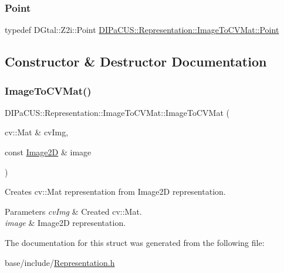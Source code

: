 \mbox{\label{structDIPaCUS_1_1Representation_1_1ImageToCVMat_a9add92562bf46f1f3bb8e944bf00e775}} 
\subsubsection{\texorpdfstring{Point}{Point}}
{\footnotesize\ttfamily typedef D\+Gtal\+::\+Z2i\+::\+Point \mbox{\hyperlink{structDIPaCUS_1_1Representation_1_1ImageToCVMat_a9add92562bf46f1f3bb8e944bf00e775}{D\+I\+Pa\+C\+U\+S\+::\+Representation\+::\+Image\+To\+C\+V\+Mat\+::\+Point}}}



\subsection{Constructor \& Destructor Documentation}
\mbox{\label{structDIPaCUS_1_1Representation_1_1ImageToCVMat_a603fcae59baae238ba419d83367be61a}} 
\subsubsection{\texorpdfstring{Image\+To\+C\+V\+Mat()}{ImageToCVMat()}}
{\footnotesize\ttfamily D\+I\+Pa\+C\+U\+S\+::\+Representation\+::\+Image\+To\+C\+V\+Mat\+::\+Image\+To\+C\+V\+Mat (\begin{DoxyParamCaption}\item[{cv\+::\+Mat \&}]{cv\+Img,  }\item[{const \mbox{\hyperlink{structDIPaCUS_1_1Representation_1_1ImageToCVMat_acca980e3cfd7e8980cf058d1e8cfb169}{Image2D}} \&}]{image }\end{DoxyParamCaption})}



Creates cv\+::\+Mat representation from Image2D representation. 


\begin{DoxyParams}{Parameters}
{\em cv\+Img} & Created cv\+::\+Mat. \\
\hline
{\em image} & Image2D representation. \\
\hline
\end{DoxyParams}


The documentation for this struct was generated from the following file\+:\begin{DoxyCompactItemize}
\item 
base/include/\mbox{\hyperlink{Representation_8h}{Representation.\+h}}\end{DoxyCompactItemize}
